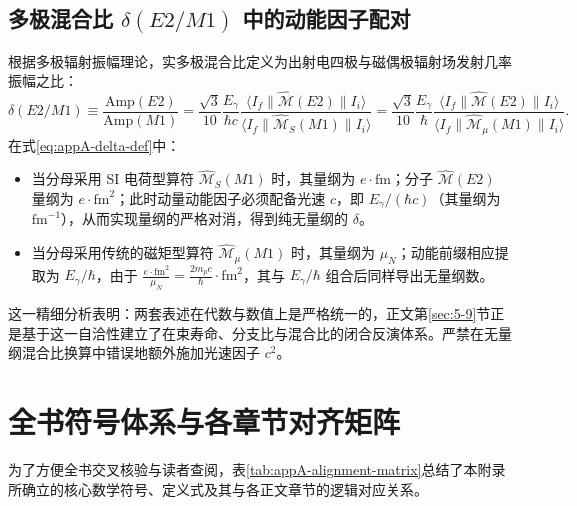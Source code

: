 \subsection{多极混合比 $\delta(E2/M1)$ 中的动能因子配对}
根据多极辐射振幅理论，实多极混合比定义为出射电四极与磁偶极辐射场发射几率振幅之比：
\begin{equation}\label{eq:appA-delta-def}
\delta(E2/M1) \equiv \frac{\mathrm{Amp}(E2)}{\mathrm{Amp}(M1)} = \frac{\sqrt{3}}{10} \frac{E_\gamma}{\hbar c} \frac{\langle I_f \| \hat{\mathcal{M}}(E2) \| I_i \rangle}{\langle I_f \| \hat{\mathcal{M}}_S(M1) \| I_i \rangle} = \frac{\sqrt{3}}{10} \frac{E_\gamma}{\hbar} \frac{\langle I_f \| \hat{\mathcal{M}}(E2) \| I_i \rangle}{\langle I_f \| \hat{\mathcal{M}}_\mu(M1) \| I_i \rangle} .
\end{equation}
在式\eqref{eq:appA-delta-def}中：
\begin{itemize}
\item 当分母采用 SI 电荷型算符 $\hat{\mathcal{M}}_S(M1)$ 时，其量纲为 $e\cdot\mathrm{fm}$；分子 $\hat{\mathcal{M}}(E2)$ 量纲为 $e\cdot\mathrm{fm}^2$；此时动量动能因子必须配备光速 $c$，即 $E_\gamma / (\hbar c)$（其量纲为 $\mathrm{fm}^{-1}$），从而实现量纲的严格对消，得到纯无量纲的 $\delta$。
\item 当分母采用传统的磁矩型算符 $\hat{\mathcal{M}}_\mu(M1)$ 时，其量纲为 $\mu_N$；动能前缀相应提取为 $E_\gamma / \hbar$，由于 $\frac{e\cdot\mathrm{fm}^2}{\mu_N} = \frac{2 m_p c}{\hbar} \cdot \mathrm{fm}^2$，其与 $E_\gamma / \hbar$ 组合后同样导出无量纲数。
\end{itemize}
这一精细分析表明：两套表述在代数与数值上是严格统一的，正文第\ref{sec:5-9}节正是基于这一自洽性建立了在束寿命、分支比与混合比的闭合反演体系。严禁在无量纲混合比换算中错误地额外施加光速因子 $c^2$。

\section{全书符号体系与各章节对齐矩阵}\label{sec:appA-7}

为了方便全书交叉核验与读者查阅，表\ref{tab:appA-alignment-matrix}总结了本附录所确立的核心数学符号、定义式及其与各正文章节的逻辑对应关系。

